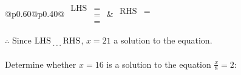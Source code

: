\documentclass[12pt]{article}
\newcounter{minipagecount}
\begin{document}
\begin{multicols}{2}
\begin{minipage}[t]{0.40\textwidth}
    \noindent
    \renewcommand{\arraystretch}{1.3} %
    \begin{tabular}{@{}p{0.60\linewidth}@{}p{0.40\linewidth}@{}}
        \(\begin{aligned}
            \text{LHS} &=  \\
                    &=  \\
                    &= 
        \end{aligned}\) &
        \(\begin{aligned}
            \text{RHS} &= \\
                    & \\
                    &
        \end{aligned}\)
    \end{tabular}
    \renewcommand{\arraystretch}{1.0} %
    \vspace{2pt}  %

    \noindent \(\therefore\) Since \(\text{LHS} \dotuline{\hspace{5mm}} \text{RHS}\), \(x = 21\) \dotuline{\hspace{12mm}} a solution to the equation.

\end{minipage}

\vspace*{0.5ex}
\vfill{}
\noindent{(\theminipagecount)}\hspace{0.1mm} %
\begin{minipage}[t]{0.40\textwidth} %

    \noindent Determine whether \(x = 16\) is a solution to the equation \(\frac{x}{8} = 2\):
    \vspace{2pt}  %


\end{minipage}
\end{multicols}
\end{document}
